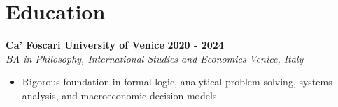 \documentclass[10pt,a4paper]{article}
\newcommand{\role}[4]{%
  \textbf{#1} \hfill \textbf{#2}\\[1pt]%
  \textit{#3} \hfill \textit{#4}\\[2pt]%
}
\begin{document}
\section{Education}
\role{Ca' Foscari University of Venice}{2020 - 2024}{BA in Philosophy, International Studies and Economics}{Venice, Italy}
\begin{itemize}
  \item Rigorous foundation in formal logic, analytical problem solving, systems analysis, and macroeconomic decision models.
\end{itemize}
\end{document}
